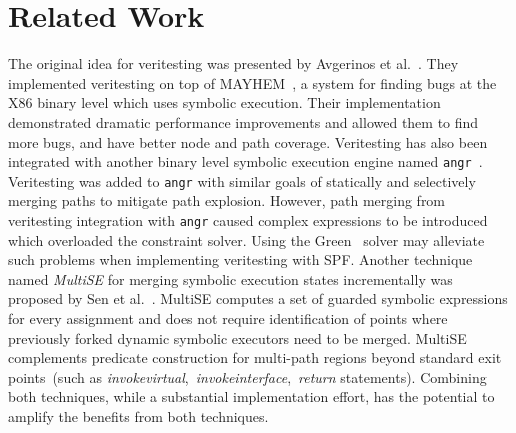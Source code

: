 \section{Related Work}

%
The original idea for veritesting was presented by Avgerinos et al.~\cite{veritesting}.
%
They implemented veritesting on top of MAYHEM~\cite{mayhem}, a system for finding bugs at the X86 binary level which uses symbolic execution.
%
Their implementation demonstrated dramatic performance improvements and allowed them to find more bugs, and have better node and path coverage.
%
Veritesting has also been integrated with another binary level symbolic execution engine named {\tt angr}~\cite{angr}.
%
Veritesting was added to {\tt angr} with similar goals of statically and selectively merging paths to mitigate path explosion.
%
However, path merging from veritesting integration with {\tt angr} caused complex expressions to be introduced which overloaded the constraint solver.
%
Using the Green~\cite{green} solver may alleviate such problems when implementing veritesting with SPF.
%
Another technique named \textit{MultiSE} for merging symbolic execution states incrementally
was proposed by Sen et al.~\cite{multise}.
%
MultiSE computes a set of guarded symbolic expressions for every
assignment and does not require identification of points where
previously forked dynamic symbolic executors need to be merged.
%
MultiSE complements predicate construction for multi-path regions beyond
standard exit points~(such as
\textit{invokevirtual},~\textit{invokeinterface},~\textit{return}
statements).
%
Combining both techniques, while a substantial implementation effort, has the potential
to amplify the benefits from both techniques.
%
%

